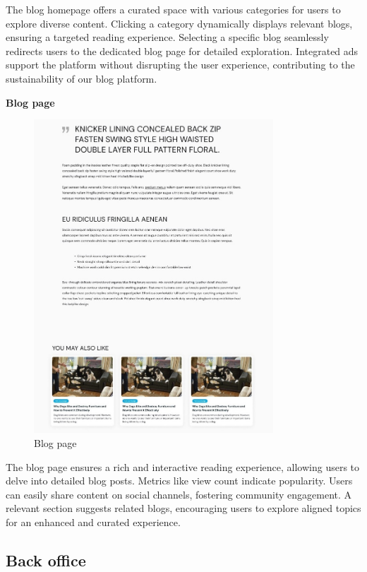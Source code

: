 The blog homepage offers a curated space with various categories for users to explore diverse content. Clicking a category dynamically displays relevant blogs, ensuring a targeted reading experience. Selecting a specific blog seamlessly redirects users to the dedicated blog page for detailed exploration. Integrated ads support the platform without disrupting the user experience, contributing to the sustainability of our blog platform.

\textbf{Blog page}

\begin{figure}[H]
    \centering
    \includegraphics[width=0.8\textwidth]{Figures/blog_page_ui.jpg}
    \caption{Blog page}
\end{figure}

The blog page ensures a rich and interactive reading experience, allowing users to delve into detailed blog posts. Metrics like view count indicate popularity. Users can easily share content on social channels, fostering community engagement. A relevant section suggests related blogs, encouraging users to explore aligned topics for an enhanced and curated experience.

\subsection{Back office}

